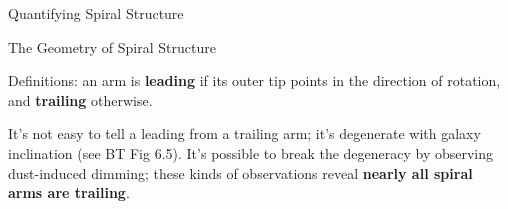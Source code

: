 \documentclass[letterpaper,landscape]{slides}
\begin{document}
\begin{slide}
\begin{center}
\vskip 3in
{\large \color{red} Quantifying Spiral Structure  }
\end{center}

\end{slide}

\begin{slide}
\begin{center}
{\large \color{red} 
                  The Geometry of Spiral Structure  }
\end{center}

\begin{center}
\vskip -0.0in
\end{center}

Definitions: an arm is {\bf leading} if its outer tip points in the direction of
rotation, and {\bf trailing} otherwise.

It's not easy to tell a leading from a trailing arm; it's degenerate with
galaxy inclination (see BT Fig 6.5). It's possible to break the degeneracy
by observing dust-induced dimming; these kinds of observations reveal
{\bf nearly all spiral arms are trailing}.

\vfill
\end{slide}
\end{document}
